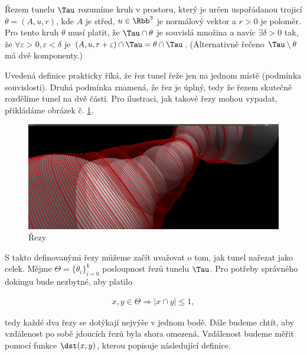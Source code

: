 \begin{defi}
Řezem tunelu $ \Tau $ rozumíme kruh v prostoru, který je určen uspořádanou trojicí
$\theta = (A, u, r)$, kde $ A $ je střed, $ u \in \Rbb^3 $ je normálový vektor a $ r > 0 $ je poloměr.
Pro tento kruh $ \theta $ musí platit, že $ \Tau \cap \theta $ je souvislá množina a navíc
$ \exists \delta > 0 $ tak, že $ \forall \varepsilon > 0,  \varepsilon < \delta $ je
$ (A, u, r + \varepsilon) \cap \Tau = \theta \cap \Tau $.
(Alternativně řečeno $\Tau \setminus \theta $ má dvě komponenty.)
\end{defi}

Uvedená definice prakticky říká, že řez tunel řeže jen na jednom místě (podmínka souvislosti).
Druhá podmínka znamená, že řez je úplný, tedy že řezem skutečně rozdělíme tunel na dvě části.
Pro ilustraci, jak takové řezy mohou vypadat, přikládáme obrázek č. \ref{fig:tunnel_cuts}.
\begin{figure}[ht]
    \centering
    \includegraphics[width=\textwidth]{img/simple_cuts.png}
    \caption{Řezy}
  \centering
  \label{fig:tunnel_cuts}
\end{figure}

S takto definovanými řezy můžeme začít uvažovat o tom, jak tunel nařezat jako celek.
Mějme $ \Theta = \{\theta_i\}_{i=0}^{k}$ posloupnost řezů tunelu $ \Tau $. Pro potřeby správného
dokingu bude nezbytné, aby platilo

\begin{align}
x, y \in \Theta \Rightarrow |x \cap y| \leq 1, \label{cond:not_intersecting}
\end{align}

tedy každé dva řezy se dotýkají nejvýše v jednom bodě. Dále budeme chtít, aby vzdálenost
po sobě jdoucích řezů byla shora omezená. Vzdálenost budeme měřit pomocí funkce
$ \dst(x, y) $, kterou popisuje následující definice.

